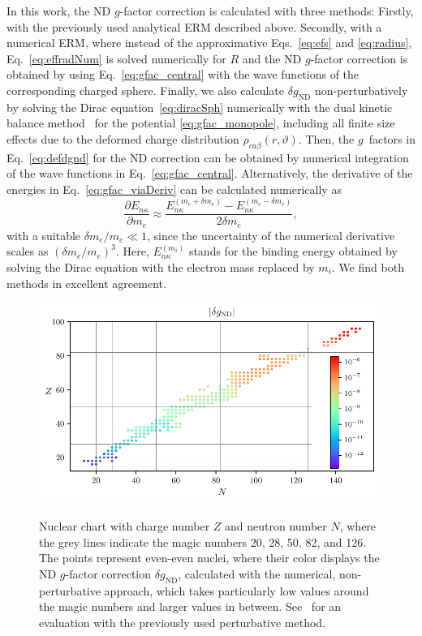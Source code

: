 In this work, the ND $g$-factor correction is calculated with three methods:
Firstly, with the previously used analytical ERM described above. Secondly, with a numerical ERM, where instead of the approximative Eqs.~\eqref{eq:efs} and \eqref{eq:radius}, Eq.~\eqref{eq:effradNum} is solved numerically for $R$ and the ND $g$-factor correction is obtained by using Eq.~\eqref{eq:gfac_central} with the wave functions of the corresponding charged sphere.
Finally, we also calculate $\delta g_{\text{ND}}$ non-perturbatively by solving the Dirac equation~\eqref{eq:diracSph} numerically with the dual kinetic balance method~\cite{dualkinetic} for the potential \eqref{eq:gfac_monopole}, including all finite size effects due to the deformed charge distribution $\rho_{ca\beta}(r,\vartheta)$. Then, the $g$~factors in Eq.~\eqref{eq:defdgnd} for the ND correction can be obtained by numerical integration of the wave functions in Eq.~\eqref{eq:gfac_central}. Alternatively, the derivative of the energies in Eq.~\eqref{eq:gfac_viaDeriv} can be calculated numerically as 
\begin{equation}
\frac{\partial E_{n\kappa}}{\partial m_e} \approx \frac{E_{n\kappa}^{(m_e+\delta m_e)}-E_{n\kappa}^{(m_e-\delta m_e)}}{2 \delta m_e},
\end{equation}
with a suitable ${\delta m_e / m_e}{\ll}{1}$, since the uncertainty of the numerical derivative scales as $(\delta m_e/m_e)^3$. Here, $E_{n\kappa}^{(m_i)}$ stands for the binding energy obtained by solving the Dirac equation with the electron mass replaced by $m_i$. We find both methods in excellent agreement.

\begin{figure}
  \centering
  \begin{minipage}[b]{\textwidth}
    \centering
    \includegraphics[width=\textwidth]{pics/dgnuclchart.pdf}\\
    \caption{\label{fig:dg}Nuclear chart with charge number $Z$ and neutron number $N$, where the grey lines indicate the magic numbers 20, 28, 50, 82, and 126. The points represent even-even nuclei, where their color displays the ND $g$-factor correction $\delta g_{\text{ND}}$, calculated with the numerical, non-perturbative approach, which takes particularly low values around the magic numbers and larger values in between. See~\cite{michel2015} for an evaluation with the previously used perturbative method.}
  \end{minipage}
\end{figure}

